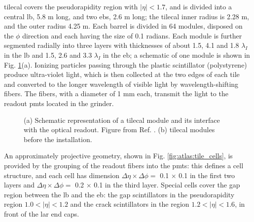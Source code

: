 \gls{tilecal} covers the pseudorapidity region with $|\eta|<1.7$, and is divided into a central \gls{lb}, 5.8 m long, and two \glspl{eb}, 2.6 m long; the \gls{tilecal} inner radius is 2.28 m, and the outer radius 4.25 m. Each barrel is divided in 64 modules, disposed on the $\phi$ direction and each having the size of 0.1 radians. Each module is further segmented radially into three layers with thicknesses of about 1.5, 4.1 and 1.8 $\lambda_I$ in the \gls{lb} and 1.5, 2.6 and 3.3 $\lambda_I$ in the \gls{eb}; a schematic of one module is shown in Fig. \ref{fig:atlas:tile}(a). Ionizing particles passing through the plastic scintillator (polystyrene) produce ultra-violet light, which is then collected at the two edges of each tile and converted to the longer wavelength of visible light by wavelength-shifting fibers. The fibers, with a diameter of 1 mm each, transmit the light to the readout \glspl{pmt} located in the grinder.

\begin{figure}[ht]
\centering
{}
\caption{(a) Schematic representation of a \gls{tilecal} module and its interface with the optical readout. Figure from Ref. \cite{atlas:atlas}. (b) \gls{tilecal} modules before the installation.}
\label{fig:atlas:tile}
\end{figure}

An approximately projective geometry, shown in Fig. \ref{fig:atlas:tile_cells}, is provided by the grouping of the readout fibers into the \glspl{pmt}: this defines a cell structure, and each cell has dimension $\Delta\eta \times \Delta\phi = $ 0.1 $\times$ 0.1 in the first two layers and $\Delta\eta \times \Delta\phi = $ 0.2 $\times$ 0.1 in the third layer. Special cells cover the gap region between the \gls{lb} and the \gls{eb}: the gap scintillators in the pseudorapidity region $1.0<|\eta|<1.2$ and the crack scintillators in the region $1.2<|\eta|<1.6$, in front of the \gls{lar} end caps.

